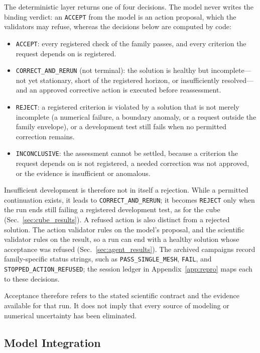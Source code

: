 \documentclass[11pt]{article}
\begin{document}
The deterministic layer returns one of four decisions. The model never
writes the binding verdict: an \texttt{ACCEPT} from the model is an action
proposal, which the validators may refuse, whereas the decisions below are
computed by code:
\begin{itemize}
    \item \texttt{ACCEPT}: every registered check of the family passes, and
    every criterion the request depends on is registered.
    \item \texttt{CORRECT\_AND\_RERUN} (not terminal): the solution is healthy
    but incomplete---not yet stationary, short of the registered horizon, or
    insufficiently resolved---and an approved corrective action is executed
    before reassessment.
    \item \texttt{REJECT}: a registered criterion is violated by a solution
    that is not merely incomplete (a numerical failure, a boundary anomaly, or
    a request outside the family envelope), or a development test still fails
    when no permitted correction remains.
    \item \texttt{INCONCLUSIVE}: the assessment cannot be settled, because a
    criterion the request depends on is not registered, a needed correction
    was not approved, or the evidence is insufficient or anomalous.
\end{itemize}
Insufficient development is therefore not in itself a rejection. While a
permitted continuation exists, it leads to \texttt{CORRECT\_AND\_RERUN}; it
becomes \texttt{REJECT} only when the run ends still failing a registered
development test, as for the cube (Sec.~\ref{sec:cube_results}). A refused
action is also distinct from a rejected solution. The action validator rules
on the model's proposal, and the scientific validator rules on the result,
so a run can end with a healthy solution whose acceptance was refused
(Sec.~\ref{sec:agent_results}). The archived campaigns record
family-specific status strings, such as \texttt{PASS\_SINGLE\_MESH},
\texttt{FAIL}, and \texttt{STOPPED\_ACTION\_REFUSED}; the session ledger in
Appendix~\ref{app:repro} maps each to these decisions.

Acceptance therefore refers to the stated scientific contract and
the evidence available for that run. It does not imply that every
source of modeling or numerical uncertainty has been eliminated.

\subsection{Model Integration}
\label{sec:model}
\end{document}
